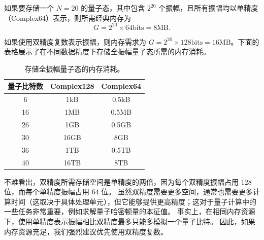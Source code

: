 如果要存储一个 $N=20$ 的量子态，其中包含 $2^{20}$ 个振幅，且所有振幅均以单精度（Complex64）表示，则所需经典内存为
\begin{equation}
    G=2^{20}\times 64 \mathrm{bits} = 8 \mathrm{MB}.
\end{equation}

如果使用双精度复数表示振幅，则内存需求为 $G=2^{20}\times 128 \mathrm{bits}=16 \mathrm{MB}$。下面的表格展示了在不同数据精度下存储全振幅量子态所需的内存消耗。

\begin{table}[ht]
    \begin{tabular}{ccc}
        \toprule
        量子比特数 & Complex128 & Complex64 \\
        \midrule
        6            & 1kB        & 0.5kB     \\
        16           & 1MB        & 0.5MB     \\
        26           & 1GB        & 0.5GB     \\
        30           & 16GB       & 8GB       \\
        36           & 1TB        & 0.5TB     \\
        40           & 16TB       & 8TB       \\
        \bottomrule
    \end{tabular}
    \caption{存储全振幅量子态的内存消耗。}
    \label{tab:mem_consume}
\end{table}

不难看出，双精度所需存储空间是单精度的两倍，因为每个双精度振幅占用 $128$ 位，而每个单精度振幅占用 $64$ 位。
虽然双精度需要更多空间，通常也需要更多计算时间（这取决于具体处理单元），但它能够提供更高精度；这对于量子计算中的一些任务非常重要，例如求解量子哈密顿量的本征值。
事实上，在相同内存资源下，使用单精度表示振幅相比双精度最多只能多模拟一个量子比特。
因此，如果内存资源充足，我们强烈建议优先使用双精度复数。
